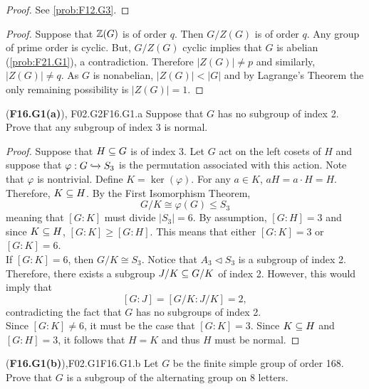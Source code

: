 \documentclass[../../AlgebraQualSolutions.tex]{subfiles}
\begin{document}
	\begin{proof}
		See \ref{prob:F12.G3}.
	\end{proof}

	\begin{proof}
		Suppose that $\mathbb{Z}(G)$ is of order $q$. Then $G/Z(G)$ is of order $q$. Any group of prime order is cyclic. But, $G/Z(G)$ cyclic implies that $G$ is abelian (\ref{prob:F21.G1}), a contradiction. Therefore $|Z(G)| \neq p$ and similarly, $|Z(G)| \neq q$. As $G$ is nonabelian, $|Z(G)| < |G|$ and by Lagrange's Theorem the only remaining possibility is $|Z(G)| =1$.
	\end{proof}

	\begin{prob}{(\textbf{F16.G1(a)}), F02.G2}{F16.G1.a}
		Suppose that $G$ has no subgroup of index 2. Prove that any subgroup of index 3 is normal.
	\end{prob}

	\begin{proof}
		Suppose that $H \subseteq G$ is of index 3. Let $G$ act on the left cosets of $H$ and suppose that $\varphi: G \xhookrightarrow{} S_3$ is the permutation associated with this action. Note that $\varphi$ is nontrivial. Define $K = \ker(\varphi)$. For any $a \in K$, $aH = a \cdot H = H$. Therefore, $K \subseteq H$. By the First Isomorphism Theorem,
			\[G/K \cong \varphi(G) \leq S_3 \]
		meaning that $[G:K]$ must divide $|S_3| = 6$. By assumption, $[G:H] = 3$ and since $K \subseteq H$, $[G:K] \geq [G:H]$. This means that either $[G:K] = 3$ or $[G:K] = 6$.\\

		If $[G:K] = 6$, then $G/K \cong S_3$. Notice that $A_3 \triangleleft S_3$ is a subgroup of index 2. Therefore, there exists a subgroup $J/K \subseteq G/K$ of index 2. However, this would imply that
			\[[G:J] = [G/K: J/K] = 2,\]
		contradicting the fact that $G$ has no subgroups of index 2.\\

		Since $[G:K] \neq 6$, it must be the case that $[G:K] = 3$. Since $K \subseteq H$ and $[G:H] = 3$, it follows that $H = K$ and thus $H$ must be normal.
	\end{proof}

	\begin{prob}{(\textbf{F16.G1(b)}),F02.G1}{F16.G1.b}
		Let $G$ be the finite simple group of order 168. Prove that $G$ is a subgroup of the alternating group on 8 letters.
	\end{prob}
\end{document}
